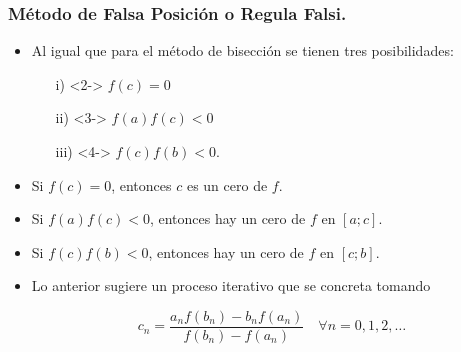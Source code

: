 \documentclass{beamer}
\begin{document}
\begin{frame}[fragile]
  \frametitle{M\'etodo de Falsa Posici\'on o Regula Falsi.}
  \begin{itemize}
    \item<1-> Al igual que para el m\'etodo de bisecci\'on se tienen tres posibilidades:
      \begin{itemize}
        \item[i)]<2-> $f (c) = 0$  
        \item[ii)]<3-> $f (a)f (c) < 0$ 
        \item[iii)]<4-> $f (c)f (b) < 0$.
      \end{itemize}
      \item<5-> Si $f (c) = 0$, entonces $c$ es un cero de $f$.
      \item<6-> Si $f (a)f (c) < 0$, entonces hay un cero de $f$ en $[a; c]$.
      \item<7-> Si $f (c)f (b) < 0$, entonces hay un cero de $f$ en $[c; b]$.
      \item<8-> Lo anterior sugiere un proceso iterativo que se concreta tomando
      \begin{block}{}
      $$
      c_n = \frac{a_nf(b_n)-b_nf(a_n)}{f(b_n)-f(a_n)} \quad\forall n=0,1,2,\ldots
      $$  
      \end{block}      
    \end{itemize}  
\end{frame}
\end{document}

